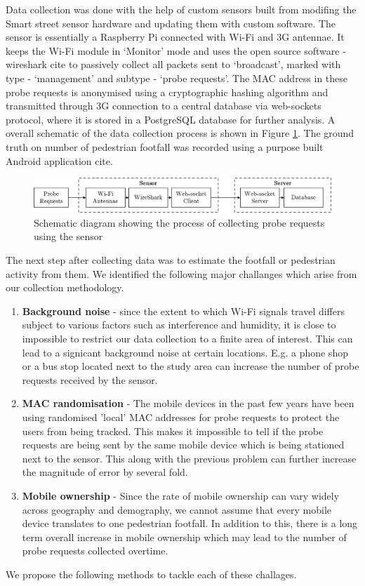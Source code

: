 Data collection was done with the help of custom sensors built from modifing the Smart street sensor \citep{sss2016} hardware and updating them with custom software.
The sensor is essentially a Raspberry Pi connected with Wi-Fi and 3G antennae.
It keeps the Wi-Fi module in `Monitor' mode and uses the open source software - wireshark cite to passively collect all packets sent to `broadcast', marked with type - `management' and subtype - `probe requests'.
The MAC address in these probe requests is anonymised using a cryptographic hashing algorithm and transmitted through 3G connection to a central database via web-sockets protocol, where it is stored in a PostgreSQL database for further analysis.
A overall schematic of the data collection process is shown in Figure \ref{datacollection_schematic}.
The ground truth on number of pedestrian footfall was recorded using a purpose built Android application cite. 

\begin{figure}
	\centering
	\includegraphics[width=\linewidth]{images/datacollection_schematic.jpeg}
	\caption{Schematic diagram showing the process of collecting probe requests using the sensor} \label{datacollection_schematic}
\end{figure}

The next step after collecting data was to estimate the footfall or pedestrian activity from them. We identified the following major challanges which arise from our collection methodology.
\begin{enumerate}
	\item \textbf{Background noise} - since the extent to which Wi-Fi signals travel differs subject to various factors such as interference and humidity, it is close to impossible to restrict our data collection to a finite area of interest. This can lead to a signicant background noise at certain locations. E.g. a phone shop or a bus stop located next to the study area can increase the number of probe requests received by the sensor.
	\item \textbf{MAC randomisation} - The mobile devices in the past few years have been using randomised 'local' MAC addresses for probe requests to protect the users from being tracked. This makes it impossible to tell if the probe requests are being sent by the same mobile device which is being stationed next to the sensor. This along with the previous problem can further increase the magnitude of error by several fold.
	\item \textbf{Mobile ownership} - Since the rate of mobile ownership can vary widely across geography and demography, we cannot assume that every mobile device translates to one pedestrian footfall. In addition to this, there is a long term overall increase in mobile ownership which may lead to the number of probe requests collected overtime. 
\end{enumerate}
We propose the following methods to tackle each of these challages.

